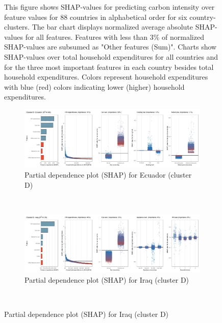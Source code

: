 \begin{figure}[ht!]
    \begin{subcaption2}
     This figure shows SHAP-values for predicting carbon intensity over feature values for 88 countries in alphabetical order for six country-clusters. The bar chart displays normalized average absolute SHAP-values for all features. Features with less than 3\% of normalized SHAP-values are subsumed as "Other features (Sum)". Charts show SHAP-values over total household expenditures for all countries and for the three most important features in each country besides total household expenditures. Colors represent household expenditures with blue (red) colors indicating lower (higher) household expenditures.
     \end{subcaption2}
\end{figure}

\begin{figure}[ht!]\ContinuedFloat
    \centering
   \begin{subfigure}[b]{\textwidth}
   \centering
         \caption{Partial dependence plot (SHAP) for Ecuador (cluster D)}
         \label{fig:5b_ECU}
         \includegraphics[width=\textwidth]{Figure 5b/Figure_5b_ECU} 
   \end{subfigure}
    \\
    \vspace{0.5cm}
    \begin{subfigure}[b]{\textwidth}
   \centering
         \caption{Partial dependence plot (SHAP) for Iraq (cluster D)}
         \label{fig:5b_IRQ}
         \includegraphics[width=\textwidth]{Figure 5b/Figure_5b_IRQ}    
   \end{subfigure}
    \\

\end{figure}
